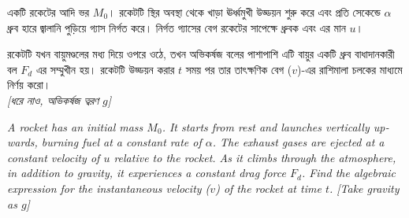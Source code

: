 \documentclass[12pt, a4paper]{article}
\begin{document}
\begin{tcolorbox}[questionbox={প্রশ্ন (Question) 9}]
\noindent
একটি রকেটের আদি ভর $M_0$। রকেটটি স্থির অবস্থা থেকে খাড়া ঊর্ধ্বমুখী উড্ডয়ন শুরু করে এবং প্রতি সেকেন্ডে $\alpha$ ধ্রুব হারে জ্বালানি পুড়িয়ে গ্যাস নির্গত করে। নির্গত গ্যাসের বেগ রকেটের সাপেক্ষে ধ্রুবক এবং এর মান $u$। 

\vspace{0.3em}
\noindent
রকেটটি যখন বায়ুমণ্ডলের মধ্য দিয়ে ওপরে ওঠে, তখন অভিকর্ষজ বলের পাশাপাশি এটি বায়ুর একটি ধ্রুব বাধাদানকারী বল $F_d$ এর সম্মুখীন হয়। রকেটটি উড্ডয়ন করার $t$ সময় পর তার তাৎক্ষণিক বেগ ($v$)-এর রাশিমালা চলকের মাধ্যমে নির্ণয় করো। \\
\textit{[ধরে নাও, অভিকর্ষজ ত্বরণ $g$]}

\vspace{0.8em}
\begin{english}
\noindent\textit{\color{darkgray}
A rocket has an initial mass $M_0$. It starts from rest and launches vertically upwards, burning fuel at a constant rate of $\alpha$. The exhaust gases are ejected at a constant velocity of $u$ relative to the rocket. As it climbs through the atmosphere, in addition to gravity, it experiences a constant drag force $F_d$. Find the algebraic expression for the instantaneous velocity ($v$) of the rocket at time $t$. [Take gravity as $g$]
}
\end{english}
\end{tcolorbox}
\end{document}
